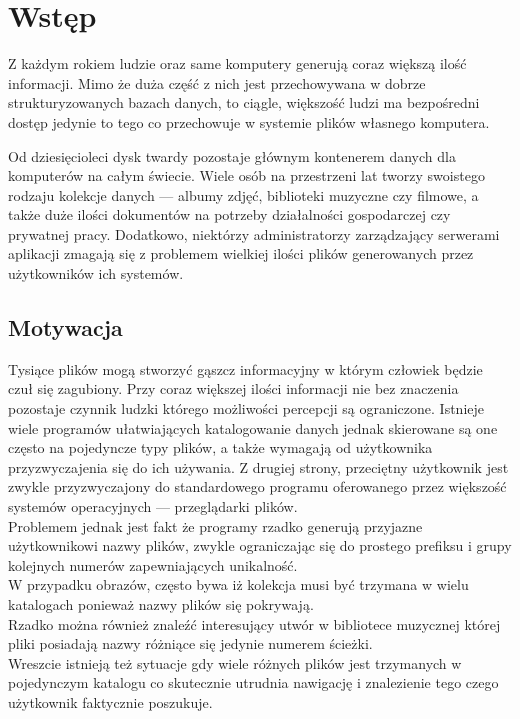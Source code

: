 \chapter{Wstęp}
\label{wstep}

\par
Z każdym rokiem ludzie oraz same komputery generują coraz większą ilość informacji.
Mimo że duża część z nich jest przechowywana w dobrze strukturyzowanych bazach danych, to ciągle, większość ludzi ma bezpośredni dostęp jedynie to tego co przechowuje w systemie plików własnego komputera.
\par
Od dziesięcioleci dysk twardy pozostaje głównym kontenerem danych dla komputerów na całym świecie.
Wiele osób na przestrzeni lat tworzy swoistego rodzaju kolekcje danych --- albumy zdjęć, biblioteki muzyczne czy filmowe, a także duże ilości dokumentów na potrzeby działalności gospodarczej czy prywatnej pracy. Dodatkowo, niektórzy administratorzy zarządzający serwerami aplikacji zmagają się z problemem wielkiej ilości plików generowanych przez użytkowników ich systemów.

\section{Motywacja}
\label{motywacja}
\par
Tysiące plików mogą stworzyć gąszcz informacyjny w którym człowiek będzie czuł się zagubiony. Przy coraz większej ilości informacji nie bez znaczenia pozostaje czynnik ludzki którego możliwości percepcji są ograniczone.
Istnieje wiele programów ułatwiających katalogowanie danych jednak skierowane są one często na pojedyncze typy plików, a także wymagają od użytkownika przyzwyczajenia się do ich używania. Z drugiej strony, przeciętny użytkownik jest zwykle przyzwyczajony do standardowego programu oferowanego przez większość systemów operacyjnych --- przeglądarki plików.\\

Problemem jednak jest fakt że programy rzadko generują przyjazne użytkownikowi nazwy plików, zwykle ograniczając się do prostego prefiksu i grupy kolejnych numerów zapewniających unikalność.\\
W przypadku obrazów, często bywa iż kolekcja musi być trzymana w wielu katalogach ponieważ nazwy plików się pokrywają.\\
Rzadko można również znaleźć interesujący utwór w bibliotece muzycznej której pliki posiadają nazwy różniące się jedynie numerem ścieżki.\\
Wreszcie istnieją też sytuacje gdy wiele różnych plików jest trzymanych w pojedynczym katalogu co skutecznie utrudnia nawigację i znalezienie tego czego użytkownik faktycznie poszukuje.

